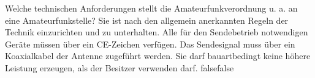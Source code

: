     {Welche technischen Anforderungen stellt die Amateurfunkverordnung u. a. an eine Amateurfunkstelle?}
    {Sie ist nach den allgemein anerkannten Regeln der Technik einzurichten und zu unterhalten.}
    {Alle für den Sendebetrieb notwendigen Geräte müssen über ein CE-Zeichen verfügen.}
    {Das Sendesignal muss über ein Koaxialkabel der Antenne zugeführt werden.}
    {Sie darf bauartbedingt keine höhere Leistung erzeugen, als der Besitzer verwenden darf.}
    {false}{false}